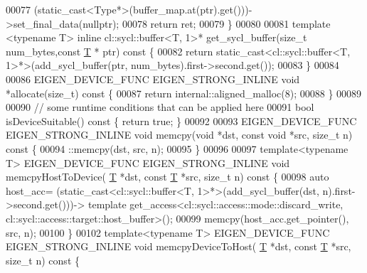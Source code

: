 \begin{DoxyCode}
00077     (\textcolor{keyword}{static\_cast<}Type*\textcolor{keyword}{>}(buffer\_map.at(ptr).get()))->set\_final\_data(\textcolor{keyword}{nullptr});
00078     \textcolor{keywordflow}{return} ret;
00079   \}
00080 
00081   \textcolor{keyword}{template} <\textcolor{keyword}{typename} T> \textcolor{keyword}{inline} cl::sycl::buffer<T, 1>* get\_sycl\_buffer(\textcolor{keywordtype}{size\_t} num\_bytes,\textcolor{keyword}{const} 
      \hyperlink{group___sparse_core___module_class_eigen_1_1_triplet}{T} * ptr)\textcolor{keyword}{ const }\{
00082     \textcolor{keywordflow}{return} \textcolor{keyword}{static\_cast<}cl::sycl::buffer<T, 1>*\textcolor{keyword}{>}(add\_sycl\_buffer(ptr, num\_bytes).first->second.get());
00083   \}
00084 
00086   EIGEN\_DEVICE\_FUNC EIGEN\_STRONG\_INLINE \textcolor{keywordtype}{void} *allocate(\textcolor{keywordtype}{size\_t})\textcolor{keyword}{ const }\{
00087     \textcolor{keywordflow}{return} internal::aligned\_malloc(8);
00088   \}
00089 
00090   \textcolor{comment}{// some runtime conditions that can be applied here}
00091   \textcolor{keywordtype}{bool} isDeviceSuitable()\textcolor{keyword}{ const }\{ \textcolor{keywordflow}{return} \textcolor{keyword}{true}; \}
00092 
00093   EIGEN\_DEVICE\_FUNC EIGEN\_STRONG\_INLINE \textcolor{keywordtype}{void} memcpy(\textcolor{keywordtype}{void} *dst, \textcolor{keyword}{const} \textcolor{keywordtype}{void} *src, \textcolor{keywordtype}{size\_t} n)\textcolor{keyword}{ const }\{
00094     ::memcpy(dst, src, n);
00095   \}
00096 
00097   \textcolor{keyword}{template}<\textcolor{keyword}{typename} T> EIGEN\_DEVICE\_FUNC EIGEN\_STRONG\_INLINE \textcolor{keywordtype}{void} memcpyHostToDevice(
      \hyperlink{group___sparse_core___module_class_eigen_1_1_triplet}{T} *dst, \textcolor{keyword}{const} \hyperlink{group___sparse_core___module_class_eigen_1_1_triplet}{T} *src, \textcolor{keywordtype}{size\_t} n)\textcolor{keyword}{ const }\{
00098     \textcolor{keyword}{auto} host\_acc= (\textcolor{keyword}{static\_cast<}cl::sycl::buffer<T, 1>*\textcolor{keyword}{>}(add\_sycl\_buffer(dst, n).first->second.get()))-> \textcolor{keyword}{
      template} get\_access<cl::sycl::access::mode::discard\_write, cl::sycl::access::target::host\_buffer>();
00099     memcpy(host\_acc.get\_pointer(), src, n);
00100   \}
00102   \textcolor{keyword}{template}<\textcolor{keyword}{typename} T> EIGEN\_DEVICE\_FUNC EIGEN\_STRONG\_INLINE \textcolor{keywordtype}{void} memcpyDeviceToHost(
      \hyperlink{group___sparse_core___module_class_eigen_1_1_triplet}{T} *dst, \textcolor{keyword}{const} \hyperlink{group___sparse_core___module_class_eigen_1_1_triplet}{T} *src, \textcolor{keywordtype}{size\_t} n)\textcolor{keyword}{ const }\{

\end{DoxyCode}
